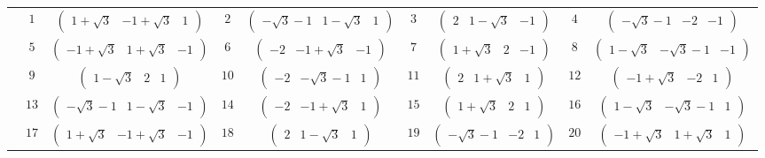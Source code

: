 \documentclass[fleqn,10pt,landscape]{article}
\begin{document}
\begin{itemize}
{\begin{center}
\begin{longtable}{ccccccccc}
 & $ 1 $ & $ \begin{pmatrix} 1 + \sqrt{3} & -1 + \sqrt{3} & 1 \end{pmatrix} $ & $ 2 $ & $ \begin{pmatrix} - \sqrt{3} - 1 & 1 - \sqrt{3} & 1 \end{pmatrix} $ & $ 3 $ & $ \begin{pmatrix} 2 & 1 - \sqrt{3} & -1 \end{pmatrix} $ & $ 4 $ & $ \begin{pmatrix} - \sqrt{3} - 1 & -2 & -1 \end{pmatrix} $ \\
& $ 5 $ & $ \begin{pmatrix} -1 + \sqrt{3} & 1 + \sqrt{3} & -1 \end{pmatrix} $ & $ 6 $ & $ \begin{pmatrix} -2 & -1 + \sqrt{3} & -1 \end{pmatrix} $ & $ 7 $ & $ \begin{pmatrix} 1 + \sqrt{3} & 2 & -1 \end{pmatrix} $ & $ 8 $ & $ \begin{pmatrix} 1 - \sqrt{3} & - \sqrt{3} - 1 & -1 \end{pmatrix} $ \\
& $ 9 $ & $ \begin{pmatrix} 1 - \sqrt{3} & 2 & 1 \end{pmatrix} $ & $ 10 $ & $ \begin{pmatrix} -2 & - \sqrt{3} - 1 & 1 \end{pmatrix} $ & $ 11 $ & $ \begin{pmatrix} 2 & 1 + \sqrt{3} & 1 \end{pmatrix} $ & $ 12 $ & $ \begin{pmatrix} -1 + \sqrt{3} & -2 & 1 \end{pmatrix} $ \\
& $ 13 $ & $ \begin{pmatrix} - \sqrt{3} - 1 & 1 - \sqrt{3} & -1 \end{pmatrix} $ & $ 14 $ & $ \begin{pmatrix} -2 & -1 + \sqrt{3} & 1 \end{pmatrix} $ & $ 15 $ & $ \begin{pmatrix} 1 + \sqrt{3} & 2 & 1 \end{pmatrix} $ & $ 16 $ & $ \begin{pmatrix} 1 - \sqrt{3} & - \sqrt{3} - 1 & 1 \end{pmatrix} $ \\
& $ 17 $ & $ \begin{pmatrix} 1 + \sqrt{3} & -1 + \sqrt{3} & -1 \end{pmatrix} $ & $ 18 $ & $ \begin{pmatrix} 2 & 1 - \sqrt{3} & 1 \end{pmatrix} $ & $ 19 $ & $ \begin{pmatrix} - \sqrt{3} - 1 & -2 & 1 \end{pmatrix} $ & $ 20 $ & $ \begin{pmatrix} -1 + \sqrt{3} & 1 + \sqrt{3} & 1 \end{pmatrix} $ \\

\end{longtable}
\end{center}}
\end{itemize}
\end{document}
